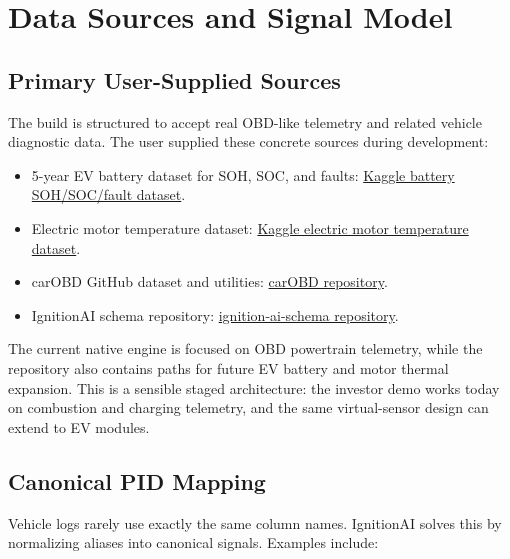 \documentclass[11pt,a4paper]{article}
\begin{document}
\section{Data Sources and Signal Model}

\subsection{Primary User-Supplied Sources}

The build is structured to accept real OBD-like telemetry and related vehicle diagnostic data. The user supplied these concrete sources during development:

\begin{itemize}
\item 5-year EV battery dataset for SOH, SOC, and faults: \href{https://www.kaggle.com/datasets/darshangovindaraju/5-year-ev-battery-dataset-for-soh-soc-and-faults}{Kaggle battery SOH/SOC/fault dataset}.
\item Electric motor temperature dataset: \href{https://www.kaggle.com/datasets/wkirgsn/electric-motor-temperature/data}{Kaggle electric motor temperature dataset}.
\item carOBD GitHub dataset and utilities: \href{https://github.com/eron93br/carOBD}{carOBD repository}.
\item IgnitionAI schema repository: \href{https://github.com/Anish-p-creator/ignition-ai-schema.git}{ignition-ai-schema repository}.
\end{itemize}

The current native engine is focused on OBD powertrain telemetry, while the repository also contains paths for future EV battery and motor thermal expansion. This is a sensible staged architecture: the investor demo works today on combustion and charging telemetry, and the same virtual-sensor design can extend to EV modules.

\subsection{Canonical PID Mapping}

Vehicle logs rarely use exactly the same column names. IgnitionAI solves this by normalizing aliases into canonical signals. Examples include:
\end{document}
